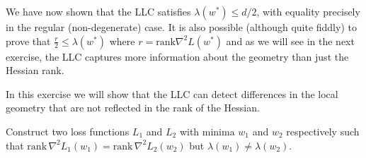 \documentclass[11pt]{article}
\newcommand{\rank}{\mathrm{rank}}
\begin{document}
We have now shown that the LLC satisfies $\lambda(w^*) \leq d/2$, with equality precisely in the regular (non-degenerate) case.
 It is also possible (although quite fiddly) to prove that $ \frac{r}{2} \leq \lambda(w^*)$ where $r= \rank \nabla^2L(w^*)$ and as we will see in the next exercise, the LLC captures more information about the geometry than just the Hessian rank.

\begin{exercise}
\label{ex:LLC-hessian-rank}
    In this exercise we will show that the LLC can detect differences in the local geometry that are not reflected in the rank of the Hessian.
    
    Construct two loss functions $L_1$ and $L_2$ with minima $w_1$ and $w_2$ respectively such that $\rank \, \nabla^2L_1(w_1) = \rank \, \nabla^2L_2(w_2)$ but $\lambda(w_1) \neq \lambda(w_2)$.
\end{exercise}
\end{document}
